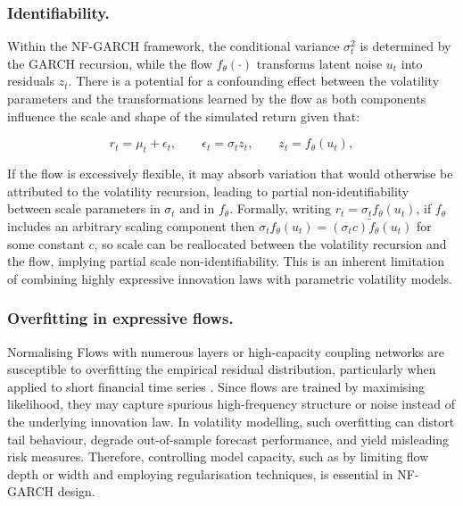 \documentclass[oneside,12pt]{CUEDthesisPSnPDF}
\newcommand{\parencite}{\citep}
\begin{document}
\subsubsection{Identifiability.}
Within the NF-GARCH framework, the conditional variance $\sigma_t^2$ is determined by the GARCH recursion, while the flow $f_\theta(\cdot)$ transforms latent noise $u_t$ into residuals $z_t$. There is a potential for a confounding effect between the volatility parameters and the transformations learned by the flow as both components influence the scale and shape of the simulated return given that:

\[
r_t = \mu_t + \epsilon_t, \qquad \epsilon_t = \sigma_t z_t, \qquad z_t = f_\theta(u_t),
\]

If the flow is excessively flexible, it may absorb variation that would otherwise be attributed to the volatility recursion, leading to partial non-identifiability between scale parameters in $\sigma_t$ and in $f_\theta$. Formally, writing $r_t = \sigma_t f_\theta(u_t)$, if $f_\theta$ includes an arbitrary scaling component then $\sigma_t f_\theta(u_t) = (\sigma_t c) \tilde{f}_\theta(u_t)$ for some constant $c$, so scale can be reallocated between the volatility recursion and the flow, implying partial scale non-identifiability. This is an inherent limitation of combining highly expressive innovation laws with parametric volatility models.\\

\subsubsection{Overfitting in expressive flows.}
Normalising Flows with numerous layers or high-capacity coupling networks are susceptible to overfitting the empirical residual distribution, particularly when applied to short financial time series \parencite{papamakarios2021normalizing}. Since flows are trained by maximising likelihood, they may capture spurious high-frequency structure or noise instead of the underlying innovation law. In volatility modelling, such overfitting can distort tail behaviour, degrade out-of-sample forecast performance, and yield misleading risk measures. Therefore, controlling model capacity, such as by limiting flow depth or width and employing regularisation techniques, is essential in NF-GARCH design.\\
\end{document}
